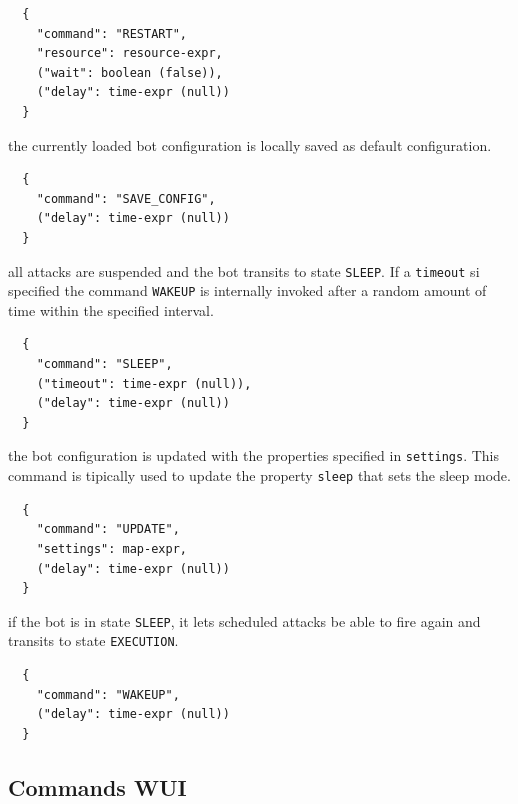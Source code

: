 \begin{description}
  \begin{verbatim}
  {
    "command": "RESTART",
    "resource": resource-expr,
    ("wait": boolean (false)),
    ("delay": time-expr (null))
  }
  \end{verbatim}

  \item[SAVE-CONFIG] the currently loaded bot configuration is locally saved as default configuration.

  \begin{verbatim}
  {
    "command": "SAVE_CONFIG",
    ("delay": time-expr (null))
  }
  \end{verbatim}

  \item[SLEEP] all attacks are suspended and the bot transits to state \texttt{SLEEP}. If a \texttt{timeout} si specified the command \texttt{WAKEUP} is internally invoked after a random amount of time within the specified interval.

  \begin{verbatim}
  {
    "command": "SLEEP",
    ("timeout": time-expr (null)),
    ("delay": time-expr (null))
  }
  \end{verbatim}

  \item[UPDATE] the bot configuration is updated with the properties specified in \texttt{settings}. This command is tipically used to update the property \texttt{sleep} that sets the sleep mode.

  \begin{verbatim}
  {
    "command": "UPDATE",
    "settings": map-expr,
    ("delay": time-expr (null))
  }
  \end{verbatim}

  \item[WAKEUP] if the bot is in state \texttt{SLEEP}, it lets scheduled attacks be able to fire again and transits to state \texttt{EXECUTION}.

  \begin{verbatim}
  {
    "command": "WAKEUP",
    ("delay": time-expr (null))
  }
  \end{verbatim}

\end{description}

\subsection{Commands WUI}
\label{sec:commands-wui}

\textcolor{green}{\lipsum[1]}

